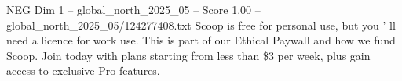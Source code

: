 \begin{textsample}{NEG Dim 1 – global\_north\_2025\_05 – Score 1.00 – global\_north\_2025\_05/124277408.txt}
Scoop is free for personal use, but you ' ll need a licence for work use.
This is part of our Ethical Paywall and how we fund Scoop.
Join today with plans starting from less than \$3 per week, plus gain access to exclusive Pro features.

\end{textsample}
